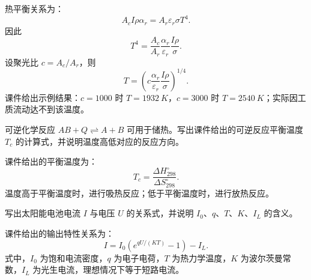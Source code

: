 \begin{solution}
热平衡关系为：
\begin{equation}
A_c I\rho\alpha_r = A_r\varepsilon_r\sigma T^4.
\end{equation}
因此
\begin{equation}
T^4 = \frac{A_c}{A_r}\frac{\alpha_r}{\varepsilon_r}\frac{I\rho}{\sigma}.
\end{equation}
设聚光比 \(c = A_c/A_r\)，则
\begin{equation}
T = \left(c\frac{\alpha_r}{\varepsilon_r}\frac{I\rho}{\sigma}\right)^{1/4}.
\end{equation}
课件给出示例结果：\(c = 1000\) 时 \(T = \qty{1932}{K}\)，\(c = 3000\) 时 \(T = \qty{2540}{K}\)；实际因工质流动达不到该温度。
\end{solution}

\begin{problem}[化学储热可逆反应平衡温度]\label{exer:calc_04_solar_p102_01}
可逆化学反应 \(AB + Q \rightleftharpoons A + B\) 可用于储热。写出课件给出的可逆反应平衡温度 \(T_c\) 的计算式，并说明温度高低对应的反应方向。
\end{problem}

\begin{solution}
课件给出的平衡温度为：
\begin{equation}
T_c = \frac{\Delta H^\circ_{298}}{\Delta S^\circ_{298}}.
\end{equation}
温度高于平衡温度时，进行吸热反应；低于平衡温度时，进行放热反应。
\end{solution}

\begin{problem}\label{exer:calc_04_solar_p121_01}
写出太阳能电池电流 \(I\) 与电压 \(U\) 的关系式，并说明 \(I_0\)、\(q\)、\(T\)、\(K\)、\(I_L\) 的含义。
\end{problem}

\begin{solution}
课件给出的输出特性关系为：
\begin{equation}
I = I_0\left(e^{qU/(KT)} - 1\right) - I_L.
\end{equation}
式中，\(I_0\) 为饱和电流密度，\(q\) 为电子电荷，\(T\) 为热力学温度，\(K\) 为波尔茨曼常数，\(I_L\) 为光生电流，理想情况下等于短路电流。
\end{solution}

